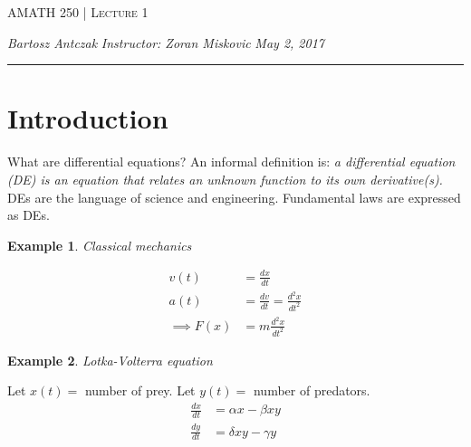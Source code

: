 \documentclass{report}
\newcommand{\lectureNum}{1}
\newcommand{\curDate}{May 2, 2017}
\newcommand{\course}{AMATH 250}
\newcommand{\instructor}{Zoran Miskovic}
\newtheorem{ex}{Example}[section]
\begin{document}
\begin{center}
\begin{Large}
\textsc{\course{} | Lecture \lectureNum{}}
\end{Large}
\end{center} 
\noindent \textit{Bartosz Antczak} \hfill
\textit{Instructor: \instructor{}} \hfill
\textit{\curDate{}}
\rule{\textwidth}{0.4pt}
\section{Introduction}
What are differential equations? An informal definition is: \textit{a differential equation (DE) is an equation that relates an unknown function to its own derivative(s).}\\
DEs are the language of science and engineering. Fundamental laws are expressed as DEs.
\begin{ex}
Classical mechanics
\end{ex}
\begin{align}
    v(t) &= \frac{dx}{dt} \\
    a(t) &= \frac{dv}{dt} = \frac{d^2x}{dt^2}\\
    \implies F(x) &= m\frac{d^2x}{dt^2} 
\end{align}
\begin{ex}
Lotka-Volterra equation
\end{ex}\noindent
Let $x(t) = $ number of prey. Let $y(t) = $ number of predators.
\begin{align}
    \frac{dx}{dt} &= \alpha x - \beta xy \\
    \frac{dy}{dt} &= \delta xy - \gamma y
\end{align}
\end{document}
